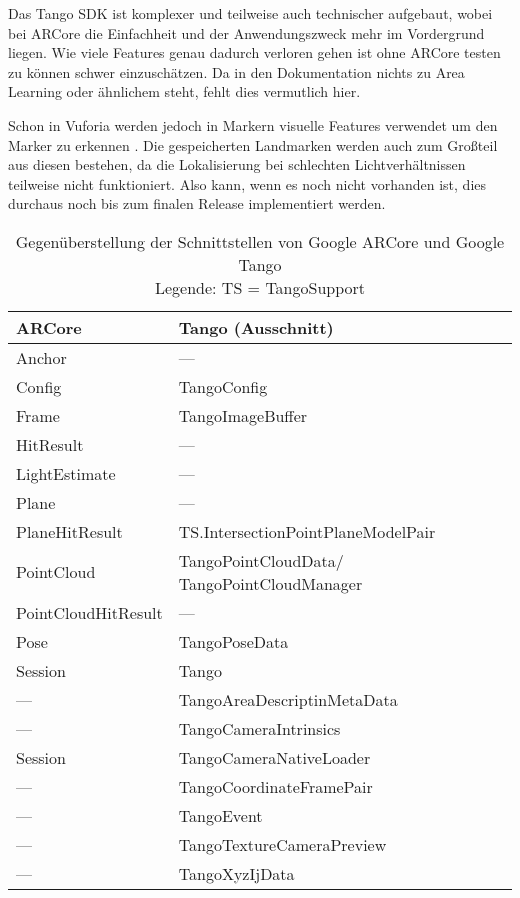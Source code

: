Das Tango SDK ist komplexer und teilweise auch technischer aufgebaut, wobei bei ARCore die Einfachheit und der Anwendungszweck mehr im Vordergrund liegen. Wie viele Features genau dadurch verloren gehen ist ohne ARCore testen zu können schwer einzuschätzen. Da in den Dokumentation nichts zu Area Learning oder ähnlichem steht, fehlt dies vermutlich hier.

Schon in Vuforia werden jedoch in Markern visuelle Features verwendet um den Marker zu erkennen \cite{fehling}. Die gespeicherten Landmarken werden auch zum Großteil aus diesen bestehen, da die Lokalisierung bei schlechten Lichtverhältnissen teilweise nicht funktioniert. Also kann, wenn es noch nicht vorhanden ist, dies durchaus noch bis zum finalen Release implementiert werden.

\begin{table}[h]
	\centering
	\begin{tabular}{|p{4cm}|p{4cm}|}
		\hline
		\textbf{ARCore} & \textbf{Tango (Ausschnitt)}\\
		\hline
		Anchor & ---\\
		Config & TangoConfig\\
		Frame & TangoImageBuffer\\
		HitResult & ---\\
		LightEstimate & ---\\
		Plane & ---\\
		PlaneHitResult & TS.IntersectionPointPlaneModelPair\\
		PointCloud & TangoPointCloudData/ TangoPointCloudManager\\
		PointCloudHitResult & ---\\
		Pose & TangoPoseData\\
		Session & Tango\\
		--- & TangoAreaDescriptinMetaData\\
		--- & TangoCameraIntrinsics\\
		Session & TangoCameraNativeLoader\\
		--- & TangoCoordinateFramePair\\
		--- & TangoEvent\\
		--- & TangoTextureCameraPreview\\
		--- & TangoXyzIjData\\
		\hline
	\end{tabular}
	\caption{Gegenüberstellung der Schnittstellen von Google ARCore\cite{arcore_android_reference} und Google Tango\cite{tango_android_reference}\\
	Legende: TS = TangoSupport}
	\label{arcore_vs_tango}
\end{table}
